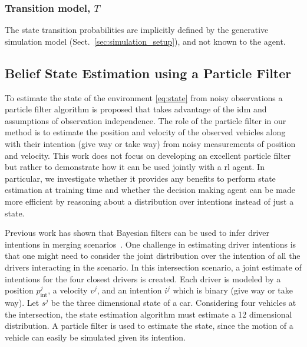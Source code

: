 	
	\subsubsection{Transition model, $T$}
	The state transition probabilities are implicitly defined by the generative simulation model (Sect.~\ref{sec:simulation_setup}), and not known to the agent.
	
	\subsection{Belief State Estimation using a Particle Filter}
	\label{sec:particle_filter}
	
	To estimate the state of the environment \eqref{eq:state} from noisy observations a particle filter algorithm is proposed that takes advantage of the \gls{idm} and assumptions of observation independence. 
	The role of the particle filter in our method is to estimate the position and velocity of the observed vehicles along with their intention (give way or take way) from noisy measurements of position and velocity. 
	This work does not focus on developing an excellent particle filter but rather to demonstrate how it can be used jointly with a \gls{rl} agent. 
	In particular, we investigate whether it provides any benefits to perform state estimation at training time and whether the decision making agent can be made more efficient by reasoning about a distribution over intentions instead of just a state. 
	
	Previous work has shown that Bayesian filters can be used to infer driver intentions in merging scenarios~\cite{bouton2019}. 
	One challenge in estimating driver intentions is that one might need to consider the joint distribution over the intention of all the drivers interacting in the scenario. 
	In this intersection scenario, a joint estimate of intentions for the four closest drivers is created.
	Each driver is modeled by a position $p^j_\text{int}$, a velocity $v^j$, and an intention $i^j$ which is binary (give way or take way). 
	Let $s^j$ be the three dimensional state of a car. 
	Considering four vehicles at the intersection, the state estimation algorithm must estimate a \num{12} dimensional distribution. A particle filter is used to estimate the state, since the motion of a vehicle can easily be simulated given its intention.%
	
